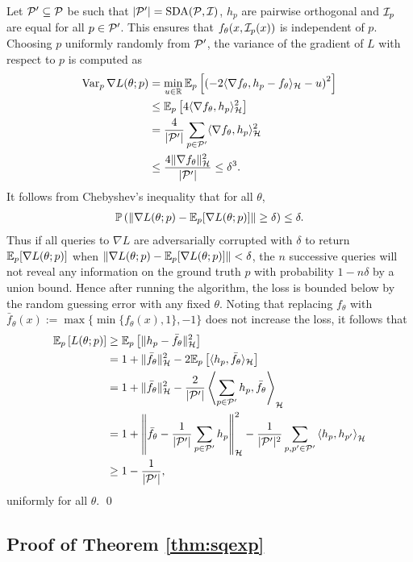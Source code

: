 Let $\mathcal{P}'\subseteq\mathcal{P}$ be such that $|\mathcal{P}'| = \operatorname{SDA}(\mathcal{P},\mathcal{I})$, $h_p$ are pairwise orthogonal and $\mathcal{I}_p$ are equal for all $p\in\mathcal{P}'$. This ensures that $f_\theta(x,\mathcal{I}_p(x))$ is independent of $p$. Choosing $p$ uniformly randomly from $\mathcal{P}'$, the variance of the gradient of $L$ with respect to $p$ is computed as
\begin{align*}
\operatorname{Var}_p \nabla L(\theta;p)&= \min_{u\in\mathbb{R}} \mathbb{E}_{p}\left[\left(-2\langle \nabla f_\theta, h_p-f_\theta\rangle_{\mathcal{H}} - u\right)^2\right]\\
&\le \mathbb{E}_{p}\left[4\langle \nabla f_\theta, h_p\rangle_{\mathcal{H}}^2\right]\\
&= \frac{4}{|\mathcal{P}'|} \sum_{p\in\mathcal{P}'} \langle\nabla f_\theta, h_p\rangle_{\mathcal{H}}^2 \\
&\le \frac{4\lVert\nabla f_\theta\rVert_{\mathcal{H}}^2}{|\mathcal{P}'|} \le\delta^3.
\end{align*}
It follows from Chebyshev's inequality that for all $\theta$,
\begin{align*}
\mathbb{P}\left(\lVert\nabla L(\theta;p) - \mathbb{E}_{p}[\nabla L(\theta;p)]\rVert \ge\delta\right) \le \delta.
\end{align*}
Thus if all queries to $\nabla L$ are adversarially corrupted with $\delta$ to return $\mathbb{E}_{p}[\nabla L(\theta;p)]$ when $\lVert\nabla L(\theta;p) - \mathbb{E}_{p}[\nabla L(\theta;p)]\rVert <\delta$, the $n$ successive queries will not reveal any information on the ground truth $p$ with probability $1-n\delta$ by a union bound. Hence after running the algorithm, the loss is bounded below by the random guessing error with any fixed $\theta$. Noting that replacing $f_\theta$ with $\bar{f}_\theta(x):=\max\{\min\{f_\theta(x),1\}, -1\}$ does not increase the loss, it follows that
\begin{align*}
\mathbb{E}_{p}\left[L(\theta;p)\right]& \ge \mathbb{E}_{p}\left[\lVert h_p-\bar{f}_\theta\rVert_{\mathcal{H}}^2\right] \\
&= 1+\lVert\bar{f}_\theta\rVert_{\mathcal{H}}^2-2\mathbb{E}_{p}\left[\langle h_p,\bar{f}_\theta\rangle_{\mathcal{H}}\right] \\
&= 1+\lVert\bar{f}_\theta\rVert_{\mathcal{H}}^2-\frac{2}{|\mathcal{P}'|} \left\langle \sum_{p\in\mathcal{P}'} h_p,\bar{f}_\theta\right\rangle_{\mathcal{H}} \\
&= 1+\left\lVert\bar{f}_\theta - \frac{1}{|\mathcal{P}'|} \sum_{p\in\mathcal{P}'} h_p\right\rVert_{\mathcal{H}}^2-\frac{1}{|\mathcal{P}'|^2} \sum_{p,p'\in\mathcal{P}'}\left\langle  h_p,h_{p'}\right\rangle_{\mathcal{H}} \\
& \ge 1 - \frac{1}{|\mathcal{P}'|},
\end{align*}
uniformly for all $\theta$. \qed


\subsection{Proof of Theorem \ref{thm:sqexp}}

